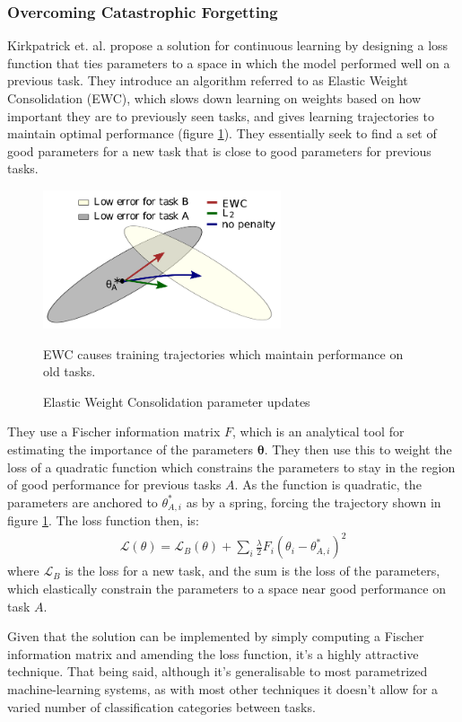 \documentclass{report}
\begin{document}
\subsubsection{Overcoming Catastrophic Forgetting}
Kirkpatrick et. al. \parencite{ewc} propose a solution for continuous learning by designing a loss function that ties parameters to a space in which the model performed well on a previous task. They introduce an algorithm referred to as Elastic Weight Consolidation (EWC), which slows down learning on weights based on how important they are to previously seen tasks, and gives learning trajectories to maintain optimal performance (figure \ref{fig:ewc:1}). They essentially seek to find a set of good parameters for a new task that is close to good parameters for previous tasks. \par
\begin{figure}[h]
 \centering
 \includegraphics[width=7cm]{ewc}
 \caption{Elastic Weight Consolidation parameter updates}
 EWC causes training trajectories which maintain performance on old tasks.
 \label{fig:ewc:1}
\end{figure}
They use a Fischer information matrix $F$, which is an analytical tool for estimating the importance of the parameters $\bm{\theta}$. They then use this to weight the loss of a quadratic function which constrains the parameters to stay in the region of good performance for previous tasks $A$. As the function is quadratic, the parameters are anchored to $\theta_{A,i}^*$ as by a spring, forcing the trajectory shown in figure \ref{fig:ewc:1}. The loss function then, is:
\begin{align}
 \mathcal{L}(\theta) = \mathcal{L}_B(\theta) + \sum_{i} \frac{\lambda}{2} F_i (\theta_i - \theta_{A,i}^*)^2
\end{align}
where $\mathcal{L}_B$ is the loss for a new task, and the sum is the loss of the parameters, which elastically constrain the parameters to a space near good performance on task $A$. \par
Given that the solution can be implemented by simply computing a Fischer information matrix and amending the loss function, it's a highly attractive technique. That being said, although it's generalisable to most parametrized machine-learning systems, as with most other techniques it doesn't allow for a varied number of classification categories between tasks.
\end{document}
